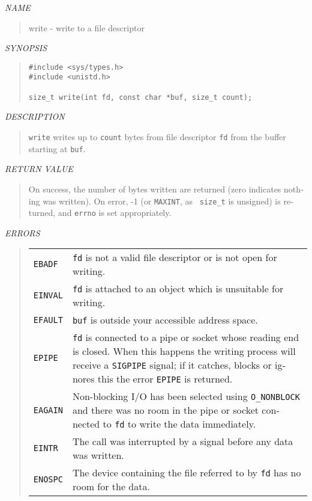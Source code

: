 \begin{appendix}
\begin{english}
{\sl NAME}
\begin{quote}
	write - write to a file descriptor
\end{quote}

{\sl SYNOPSIS}
\begin{quote}
\begin{verbatim}
#include <sys/types.h>
#include <unistd.h>

size_t write(int fd, const char *buf, size_t count);
\end{verbatim}
\end{quote}

{\sl DESCRIPTION}
\begin{quote}
	{\tt write} writes up to {\tt count} bytes from file descriptor
	{\tt fd} from the buffer starting at {\tt buf}.
\end{quote}

{\sl RETURN VALUE}
\begin{quote}
	On success, the number of bytes written are returned (zero indicates
	 nothing was written). On error, -1 (or {\tt MAXINT}, as {\tt
	size\_t} is unsigned) is returned, and {\tt errno} is set
	appropriately.
\end{quote}

{\sl ERRORS}
\begin{quote}
	\begin{tabular}{lp{8cm}}
		{\tt EBADF}	&
			{\tt fd} is not a valid file descriptor or is not open for writing.\\
		{\tt EINVAL}	&
			{\tt fd} is attached to an object which is unsuitable for writing.\\
		{\tt EFAULT}	&
			{\tt buf} is outside your accessible address space.\\
		{\tt EPIPE}	&
			{\tt fd} is connected to a pipe or socket whose reading end is closed. When
			this happens the writing process will receive a {\tt SIGPIPE} signal; if
			it catches, blocks or ignores this the error {\tt EPIPE} is returned.\\
		{\tt EAGAIN}	&
			Non-blocking I/O has been selected using {\tt O\_NONBLOCK} and there was no
			room in the pipe or socket connected to {\tt fd} to write the data
			immediately.\\
		{\tt EINTR}	&
			The call was interrupted by a signal before any data was written.\\
		{\tt ENOSPC}	&
			The device containing the file referred to by {\tt fd} has no room for the
			data.\\
	\end{tabular}


\end{quote}
\end{english}
\end{appendix}
